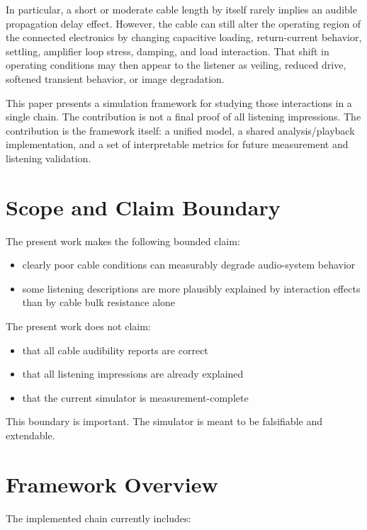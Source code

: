 \documentclass[a4paper,11pt]{article}
\begin{document}
In particular, a short or moderate cable length by itself rarely implies an
audible propagation delay effect. However, the cable can still alter the
operating region of the connected electronics by changing capacitive loading,
return-current behavior, settling, amplifier loop stress, damping, and load
interaction. That shift in operating conditions may then appear to the listener
as veiling, reduced drive, softened transient behavior, or image degradation.

This paper presents a simulation framework for studying those interactions in a
single chain. The contribution is not a final proof of all listening
impressions. The contribution is the framework itself: a unified model, a
shared analysis/playback implementation, and a set of interpretable metrics for
future measurement and listening validation.

\section{Scope and Claim Boundary}

The present work makes the following bounded claim:

\begin{itemize}
  \item clearly poor cable conditions can measurably degrade audio-system behavior
  \item some listening descriptions are more plausibly explained by interaction effects than by cable bulk resistance alone
\end{itemize}

The present work does not claim:

\begin{itemize}
  \item that all cable audibility reports are correct
  \item that all listening impressions are already explained
  \item that the current simulator is measurement-complete
\end{itemize}

This boundary is important. The simulator is meant to be falsifiable and
extendable.

\section{Framework Overview}

The implemented chain currently includes:
\end{document}
